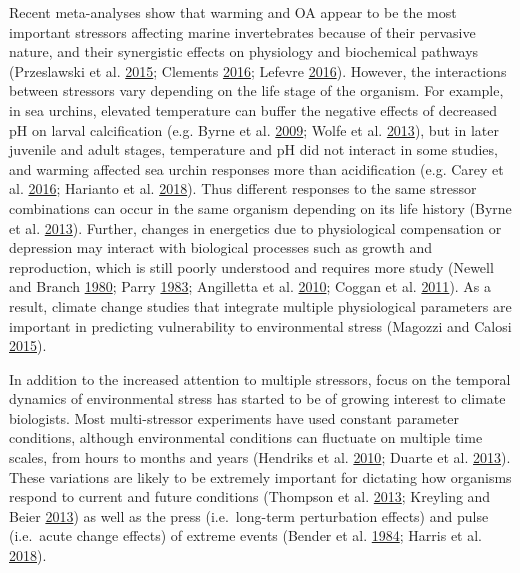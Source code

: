 \documentclass[a4paper,10pt, oneside]{memoir}
\begin{document}
Recent meta-analyses show that warming and OA appear to be the most important stressors affecting marine invertebrates because of their pervasive nature, and their synergistic effects on physiology and biochemical pathways (Przeslawski et al. \protect\hyperlink{ref-Przeslawski2015}{2015}; Clements \protect\hyperlink{ref-Clements2016}{2016}; Lefevre \protect\hyperlink{ref-Lefevre2016}{2016}).
However, the interactions between stressors vary depending on the life stage of the organism.
For example, in sea urchins, elevated temperature can buffer the negative effects of decreased pH on larval calcification (e.g. Byrne et al. \protect\hyperlink{ref-Byrne2009}{2009}; Wolfe et al. \protect\hyperlink{ref-Wolfe2013}{2013}), but in later juvenile and adult stages, temperature and pH did not interact in some studies, and warming affected sea urchin responses more than acidification (e.g. Carey et al. \protect\hyperlink{ref-Carey2016}{2016}; Harianto et al. \protect\hyperlink{ref-Harianto2018}{2018}).
Thus different responses to the same stressor combinations can occur in the same organism depending on its life history (Byrne et al. \protect\hyperlink{ref-Byrne2013}{2013}).
Further, changes in energetics due to physiological compensation or depression may interact with biological processes such as growth and reproduction, which is still poorly understood and requires more study (Newell and Branch \protect\hyperlink{ref-Newell1980}{1980}; Parry \protect\hyperlink{ref-Parry1983}{1983}; Angilletta et al. \protect\hyperlink{ref-Angilletta2010}{2010}; Coggan et al. \protect\hyperlink{ref-Coggan2011}{2011}).
As a result, climate change studies that integrate multiple physiological parameters are important in predicting vulnerability to environmental stress (Magozzi and Calosi \protect\hyperlink{ref-Magozzi2015}{2015}).

In addition to the increased attention to multiple stressors, focus on the temporal dynamics of environmental stress has started to be of growing interest to climate biologists.
Most multi-stressor experiments have used constant parameter conditions, although environmental conditions can fluctuate on multiple time scales, from hours to months and years (Hendriks et al. \protect\hyperlink{ref-Hendriks2010}{2010}; Duarte et al. \protect\hyperlink{ref-Duarte2013}{2013}).
These variations are likely to be extremely important for dictating how organisms respond to current and future conditions (Thompson et al. \protect\hyperlink{ref-Thompson2013}{2013}; Kreyling and Beier \protect\hyperlink{ref-Kreyling2013}{2013}) as well as the press (i.e.~long-term perturbation effects) and pulse (i.e.~acute change effects) of extreme events (Bender et al. \protect\hyperlink{ref-Bender1984}{1984}; Harris et al. \protect\hyperlink{ref-Harris2018}{2018}).
\end{document}
